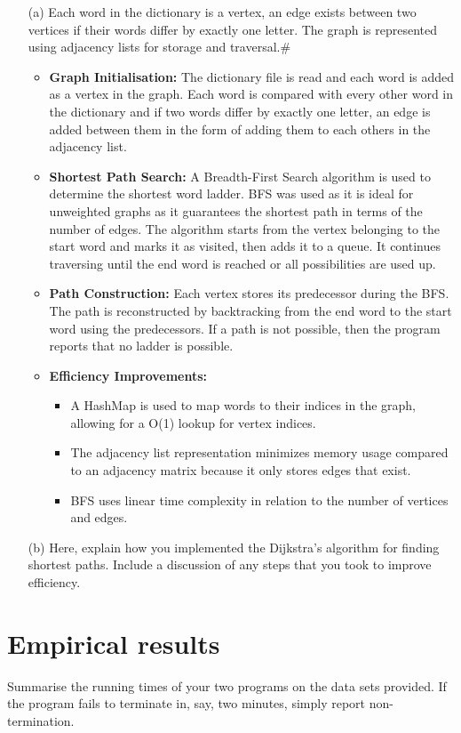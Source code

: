 \documentclass{article}
\begin{document}
\begin{itemize}
\item[(a)] 
Each word in the dictionary is a vertex, an edge exists between two vertices if their words differ by exactly one letter. The graph is represented using adjacency lists for storage and traversal.#
\begin{itemize}
    \item \textbf{Graph Initialisation:} 
    The dictionary file is read and each word is added as a vertex in the graph. Each word is compared with every other word in the dictionary and if two words differ by exactly one letter, an edge is added between them in the form of adding them to each others in the adjacency list. 

    \item \textbf{Shortest Path Search:} 
    A Breadth-First Search algorithm is used to determine the shortest word ladder. BFS was used as it is ideal for unweighted graphs as it guarantees the shortest path in terms of the number of edges. The algorithm starts from the vertex belonging to the start word and marks it as visited, then adds it to a queue. It continues traversing until the end word is reached or all possibilities are used up.

    \item \textbf{Path Construction:} 
    Each vertex stores its predecessor during the BFS. The path is reconstructed by backtracking from the end word to the start word using the predecessors. If a path is not possible, then the program reports that no ladder is possible.

    \item \textbf{Efficiency Improvements:} 
    \begin{itemize}
        \item A HashMap is used to map words to their indices in the graph, allowing for a  O(1) lookup for vertex indices.
        \item The adjacency list representation minimizes memory usage compared to an adjacency matrix because it only stores edges that exist.
        \item BFS uses linear time complexity in relation  to the number of vertices and edges.
    \end{itemize}
\end{itemize}

\item[(b)]
Here, explain how you implemented the Dijkstra’s algorithm for finding shortest paths. Include a discussion of any steps that you took to improve efficiency.
\end{itemize}

\section*{Empirical results}

Summarise the running times of your two programs on the data sets provided. If the program fails to terminate in, say, two minutes, simply report non-termination. 
\end{document}
